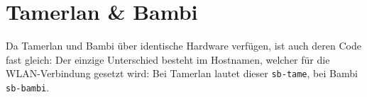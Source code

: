 \section{Tamerlan \& Bambi}
\label{subsec:software_tamerlan}
Da Tamerlan und Bambi über identische Hardware verfügen,
ist auch deren Code fast gleich:
%
Der einzige Unterschied besteht im Hostnamen, welcher für die WLAN-Verbindung gesetzt wird:
%
Bei Tamerlan lautet dieser \texttt{sb-tame}, bei Bambi \texttt{sb-bambi}.